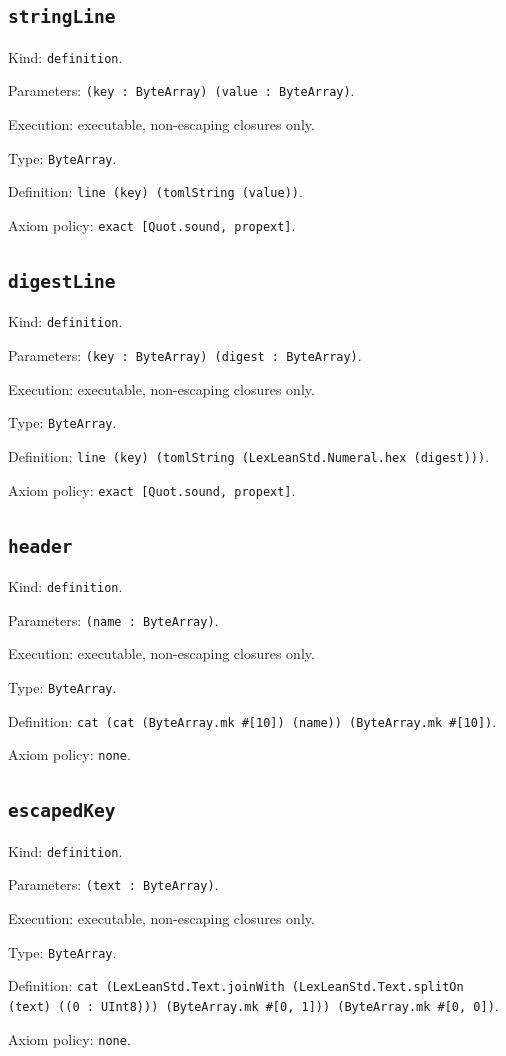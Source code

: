 \documentclass[11pt]{article}
\begin{document}
\subsection*{\texttt{stringLine}}
\noindent Kind: \texttt{definition}.\par
\noindent Parameters: \texttt{(key : ByteArray) (value : ByteArray)}.\par
\noindent Execution: executable, non-escaping closures only.\par
\noindent Type: \texttt{ByteArray}.\par
\noindent Definition: \texttt{line (key) (tomlString (value))}.\par
\noindent Axiom policy: \texttt{exact [Quot.sound, propext]}.\par
\subsection*{\texttt{digestLine}}
\noindent Kind: \texttt{definition}.\par
\noindent Parameters: \texttt{(key : ByteArray) (digest : ByteArray)}.\par
\noindent Execution: executable, non-escaping closures only.\par
\noindent Type: \texttt{ByteArray}.\par
\noindent Definition: \texttt{line (key) (tomlString (LexLeanStd.Numeral.hex (digest)))}.\par
\noindent Axiom policy: \texttt{exact [Quot.sound, propext]}.\par
\subsection*{\texttt{header}}
\noindent Kind: \texttt{definition}.\par
\noindent Parameters: \texttt{(name : ByteArray)}.\par
\noindent Execution: executable, non-escaping closures only.\par
\noindent Type: \texttt{ByteArray}.\par
\noindent Definition: \texttt{cat (cat (ByteArray.mk \#[10]) (name)) (ByteArray.mk \#[10])}.\par
\noindent Axiom policy: \texttt{none}.\par
\subsection*{\texttt{escapedKey}}
\noindent Kind: \texttt{definition}.\par
\noindent Parameters: \texttt{(text : ByteArray)}.\par
\noindent Execution: executable, non-escaping closures only.\par
\noindent Type: \texttt{ByteArray}.\par
\noindent Definition: \texttt{cat (LexLeanStd.Text.joinWith (LexLeanStd.Text.splitOn (text) ((0 : UInt8))) (ByteArray.mk \#[0, 1])) (ByteArray.mk \#[0, 0])}.\par
\noindent Axiom policy: \texttt{none}.\par
\end{document}
